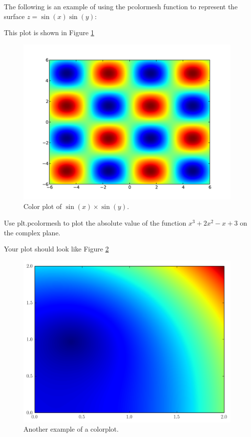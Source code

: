 The following is an example of using the pcolormesh function to represent 
the surface $z=\sin(x)\sin(y)$:


 
This plot is shown in Figure \ref{mpl:pcmexample}

\begin{figure} 
\includegraphics[width=\textwidth]{sinxsiny.pdf}
\caption{Color plot of $\sin\left(x\right)\times\sin\left(y\right)$.}
\label{mpl:pcmexample} 
\end{figure}

\begin{problem} Use plt.pcolormesh to plot the absolute value of the function 
$x^3 +2x^2 -x +3$ on the complex plane.

Your plot should look like Figure \ref{mpl:pcolormesh} 
\end{problem}


\begin{figure} 
\includegraphics[width=\textwidth]{pcolor2.png}
\caption{Another example of a colorplot.} 
\label{mpl:pcolormesh}
\end{figure}


